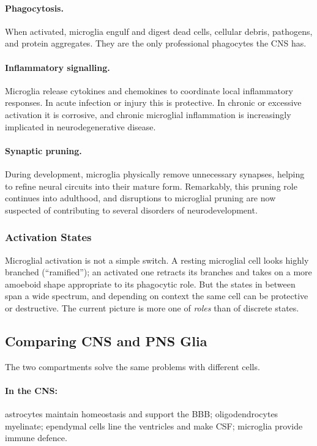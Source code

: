 \documentclass[11pt]{article}
\begin{document}
\paragraph{Phagocytosis.} When activated, microglia engulf and digest dead cells, cellular debris, pathogens, and protein aggregates. They are the only professional phagocytes the CNS has.

\paragraph{Inflammatory signalling.} Microglia release cytokines and chemokines to coordinate local inflammatory responses. In acute infection or injury this is protective. In chronic or excessive activation it is corrosive, and chronic microglial inflammation is increasingly implicated in neurodegenerative disease.

\paragraph{Synaptic pruning.} During development, microglia physically remove unnecessary synapses, helping to refine neural circuits into their mature form. Remarkably, this pruning role continues into adulthood, and disruptions to microglial pruning are now suspected of contributing to several disorders of neurodevelopment.

\subsubsection{Activation States}

Microglial activation is not a simple switch. A resting microglial cell looks highly branched (``ramified''); an activated one retracts its branches and takes on a more amoeboid shape appropriate to its phagocytic role. But the states in between span a wide spectrum, and depending on context the same cell can be protective or destructive. The current picture is more one of \textit{roles} than of discrete states.

\subsection{Comparing CNS and PNS Glia}

The two compartments solve the same problems with different cells.

\paragraph{In the CNS:} astrocytes maintain homeostasis and support the BBB; oligodendrocytes myelinate; ependymal cells line the ventricles and make CSF; microglia provide immune defence.
\end{document}
